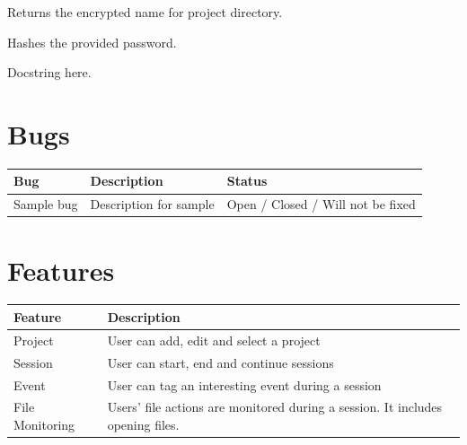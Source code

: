 \documentclass[letterpaper,10pt,english]{sphinxmanual}
\begin{document}

\begin{fulllineitems}
\label{utils:utils.get_encrypted_directory_name}
Returns the encrypted name for project directory.

\end{fulllineitems}


\begin{fulllineitems}
\label{utils:utils.hash_password}
Hashes the provided password.

\end{fulllineitems}


\begin{fulllineitems}
\label{utils:utils.set_logger_level}
Docstring here.

\end{fulllineitems}



\chapter{Bugs}
\label{bugs::doc}\label{bugs:bugs}
\begin{tabulary}{\linewidth}{|L|L|L|}
\hline
\textbf{\relax 
Bug
} & \textbf{\relax 
Description
} & \textbf{\relax 
Status
}\\\hline

Sample bug
 & 
Description for sample
 & 
Open / Closed / Will not be fixed
\\\hline
\end{tabulary}



\chapter{Features}
\label{features::doc}\label{features:features}
\begin{tabulary}{\linewidth}{|L|L|}
\hline
\textbf{\relax 
Feature
} & \textbf{\relax 
Description
}\\\hline

Project
 & 
User can add, edit and select a project
\\\hline

Session
 & 
User can start, end and continue sessions
\\\hline

Event
 & 
User can tag an interesting event during  a session
\\\hline

File Monitoring
 & 
Users' file actions are monitored during a session. It includes opening files.
\\\hline
\end{tabulary}
\end{document}
